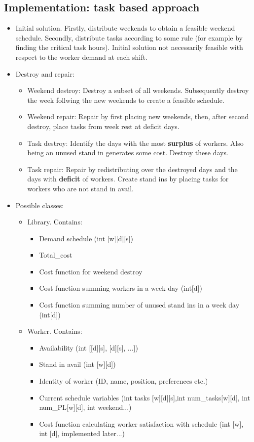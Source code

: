 \documentclass{article}
\begin{document}
	\subsection*{Implementation: task based approach} 
	\begin{itemize}
	\item Initial solution. Firstly, distribute weekends to obtain a feasible weekend schedule. Secondly, distribute tasks according to some rule (for example by finding  the critical task hours). Initial solution not necessarily feasible with respect to the worker demand at each shift.
	\item Destroy and repair: 
		\begin{itemize}
		\item Weekend destroy: Destroy a subset of all weekends. Subsequently destroy the week follwing the new weekends to create a feasible schedule.
		\item Weekend repair: Repair by first placing new weekends, then, after second destroy, place tasks from week rest at deficit days.
		\item Task destroy: Identify the days with the most \textbf{surplus} of workers. Also being an unused stand in generates some cost. Destroy these days.
		\item Task repair: Repair by redistributing over the destroyed days and the days with \textbf{deficit} of workers. Create stand ins by placing tasks for workers who are not stand in avail.
		\end{itemize}
	\item Possible classes:
		\begin{itemize}
		\item Library. Contains:
		\begin{itemize}
			\item Demand schedule (int [w][d][s])
			\item Total\_cost
			\item Cost function for weekend destroy 
			\item Cost function summing workers in a week day (int[d])
			\item Cost function summing number of unused stand ins in a week day (int[d])
			
		\end{itemize} 
		\item Worker. Contains:
		\begin{itemize}
				\item Availability (int [[d][s], [d][s], ...])
				\item Stand in avail (int [w][d])
				\item Identity of worker (ID, name, position, preferences etc.)
				\item Current schedule variables (int tasks [w][d][s],int num\_tasks[w][d], int num\_PL[w][d], int weekend...)
				\item Cost function calculating worker satisfaction with schedule (int [w], int [d], implemented later...)
		\end{itemize} 
		\end{itemize}
	\end{itemize}
\end{document}
